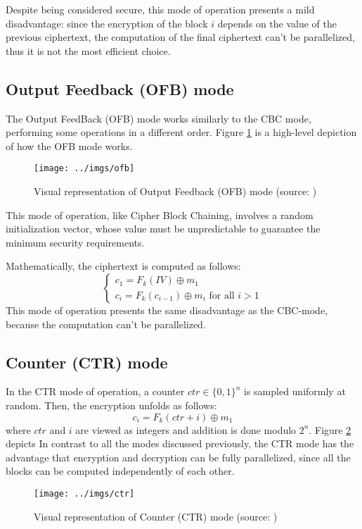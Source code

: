 \documentclass[12pt,a4paper]{book}
\theoremstyle{definition}
\begin{document}
	Despite being considered secure, this mode of operation presents a mild disadvantage: since the encryption of the block $i$ depends on the value of the previous ciphertext, the computation of the final ciphertext can't be parallelized, thus it is not the most efficient choice.
	\subsection{Output Feedback (OFB) mode}
	The Output FeedBack (OFB) mode works similarly to the CBC mode, performing some operations in a different order. Figure \ref{fig:ofb} is a high-level depiction of how the OFB mode works.
	\begin{figure}
		\centering
		\texttt{[image: ../imgs/ofb]}
		\captionsetup{width=.7\linewidth}
		\caption{Visual representation of Output Feedback (OFB) mode (source: \cite{Katz2007})}
		\label{fig:ofb}
	\end{figure}
	This mode of operation, like Cipher Block Chaining, involves a random initialization vector, whose value must be unpredictable to guarantee the minimum security requirements.
	
	Mathematically, the ciphertext is computed as follows:
	\[
	\begin{cases}
		c_1 = F_k(IV) \oplus m_1\\
		c_i = F_k(c_{i-1}) \oplus m_i \text{ for all } i>1
	\end{cases}
	\]
	This mode of operation presents the same disadvantage as the CBC-mode, because the computation can't be parallelized.
	\subsection{Counter (CTR) mode}
	In the CTR mode of operation, a counter $ctr \in \{0,1\}^n$ is sampled uniformly at random. Then, the encryption unfolds as follows:
	\[
	c_i = F_k(ctr + i) \oplus m_1
	\]
	where $ctr$ and $i$ are viewed as integers and addition is done modulo $2^n$. Figure \ref{fig:ctr} depicts In contrast to all the modes discussed previously, the CTR mode has the advantage that encryption and decryption can be fully parallelized, since all the blocks can be computed independently of each other.
	\begin{figure}
		\centering
		\texttt{[image: ../imgs/ctr]}
		\captionsetup{width=.7\linewidth}
		\caption{Visual representation of Counter (CTR) mode (source: \cite{Katz2007})}
		\label{fig:ctr}
	\end{figure}
	
\end{document}
